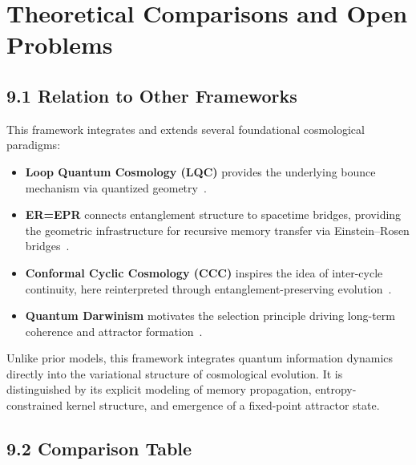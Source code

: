 \section{Theoretical Comparisons and Open Problems}
\label{sec:comparisons}

\subsection{9.1 Relation to Other Frameworks}

This framework integrates and extends several foundational cosmological paradigms:
\begin{itemize}
    \item \textbf{Loop Quantum Cosmology (LQC)} provides the underlying bounce mechanism via quantized geometry~\cite{ashtekar2006quantum, bojowald2001absence}.
    \item \textbf{ER=EPR} connects entanglement structure to spacetime bridges, providing the geometric infrastructure for recursive memory transfer via Einstein–Rosen bridges~\cite{maldacena2013cool}.
    \item \textbf{Conformal Cyclic Cosmology (CCC)} inspires the idea of inter-cycle continuity, here reinterpreted through entanglement-preserving evolution~\cite{penrose2010cycles}.
    \item \textbf{Quantum Darwinism} motivates the selection principle driving long-term coherence and attractor formation~\cite{zurek_quantum_2009}.
\end{itemize}

Unlike prior models, this framework integrates quantum information dynamics directly into the variational structure of cosmological evolution. It is distinguished by its explicit modeling of memory propagation, entropy-constrained kernel structure, and emergence of a fixed-point attractor state.

\subsection{9.2 Comparison Table}

